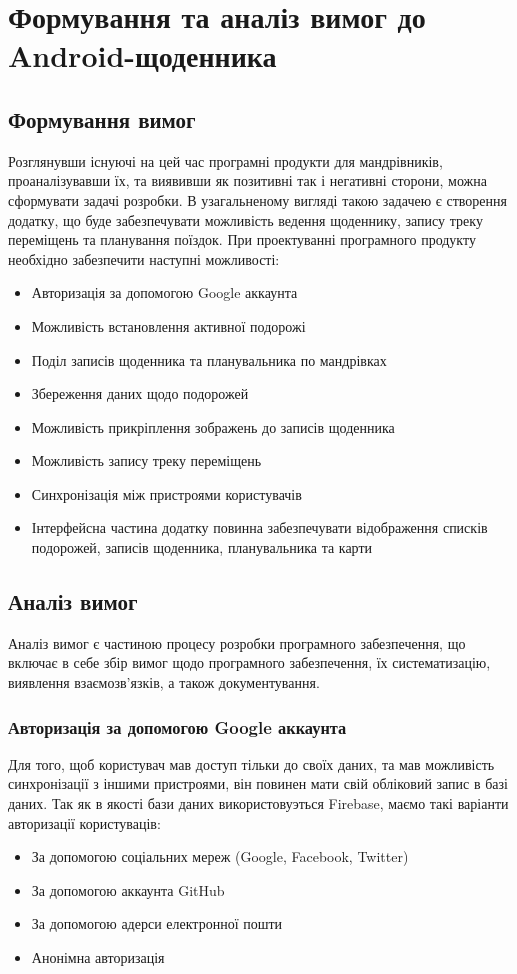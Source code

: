 \documentclass[../main.tex]{subfiles}
\begin{document}
\chapter{Формування та аналіз вимог до Android-щоденника}

\section{Формування вимог}

Розглянувши існуючі на цей час програмні продукти для мандрівників, проаналізувавши їх, та виявивши як позитивні так і негативні сторони, можна сформувати задачі розробки. В узагальненому вигляді такою задачею є створення додатку, що буде забезпечувати можливість ведення щоденнику, запису треку переміщень та планування поїздок.
При проектуванні програмного продукту необхідно забезпечити наступні можливості:

\begin{itemize}
	\item Авторизація за допомогою Google аккаунта
	\item Можливість встановлення активної подорожі
	\item Поділ записів щоденника та планувальника по мандрівках
	\item Збереження даних щодо подорожей
	\item Можливість прикріплення зображень до записів щоденника
	\item Можливість запису треку переміщень
	\item Синхронізація між пристроями користувачів
	\item Інтерфейсна частина додатку повинна забезпечувати відображення списків подорожей, записів щоденника, планувальника та карти
\end{itemize}

\section{Аналіз вимог}

Аналіз вимог є частиною процесу розробки програмного забезпечення, що включає в себе збір вимог щодо програмного забезпечення, їх систематизацію, виявлення взаємозв'язків, а також документування.

\subsection{Авторизація за допомогою Google аккаунта}
Для того, щоб користувач мав доступ тільки до своїх даних, та мав можливість синхронізації з іншими пристроями, він повинен мати свій обліковий запис в базі даних. Так як в якості бази даних використовуэться Firebase, маємо такі варіанти авторизації користуваців: 
\begin{itemize}
	\item За допомогою соціальних мереж (Google, Facebook, Twitter)
	\item За допомогою аккаунта GitHub
	\item За допомогою адерси електронної пошти
	\item Анонімна авторизація
\end{itemize}
\end{document}

